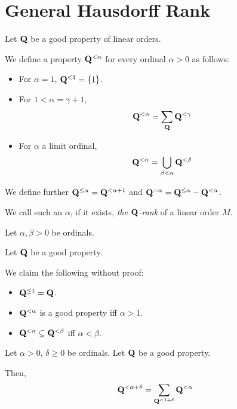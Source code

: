 
\section{General Hausdorff Rank}

\begin{definition}
  Let $\mathbf{Q}$ be a good property of linear orders.

  We define a property $\mathbf{Q}^{< \alpha}$
  for every ordinal $\alpha > 0$ as follows:

  \begin{itemize}
    \item For $\alpha = 1$, $\mathbf{Q}^{< 1} = \left\{ {1} \right\}$.
    \item For $1 < \alpha = \gamma + 1$,
          \[\mathbf{Q}^{< \alpha} = \sum_{\mathbf{Q}}{\mathbf{Q}^{< \gamma}}\]
    \item For $\alpha$ a limit ordinal,
          \[\mathbf{Q}^{< \alpha} = \bigcup_{\beta < \alpha} \mathbf{Q}^{< \beta}\]
  \end{itemize}

  We define further $\mathbf{Q}^{\le \alpha} = \mathbf{Q}^{< \alpha + 1}$
  and $\mathbf{Q}^{= \alpha} = \mathbf{Q}^{\le \alpha} - \mathbf{Q}^{< \alpha}$.

  We call such an $\alpha$, if it exists,
  \emph{the $\mathbf{Q}$-rank} of a linear order $M$.
\end{definition}

\begin{observations}
  Let $\alpha, \beta > 0$ be ordinals.

  Let $\mathbf{Q}$ be a good property.

  We claim the following without proof:

  \begin{itemize}
    \item $\mathbf{Q}^{\le 1} = \mathbf{Q}$.
    \item $\mathbf{Q}^{< \alpha}$ is a good property iff $\alpha > 1$.
    \item $\mathbf{Q}^{< \alpha} \subsetneq \mathbf{Q}^{< \beta}$ iff $\alpha < \beta$.
  \end{itemize}
\end{observations}


\begin{lemma}
  Let $\alpha > 0$, $\delta \ge 0$ be ordinals. Let $\mathbf{Q}$ be a good property.

  Then,
  \[
    \mathbf{Q}^{< \alpha + \delta}
    = \sum_{\mathbf{Q}^{< 1 + \delta}}{\mathbf{Q}^{< \alpha}}
  \]
\end{lemma}

